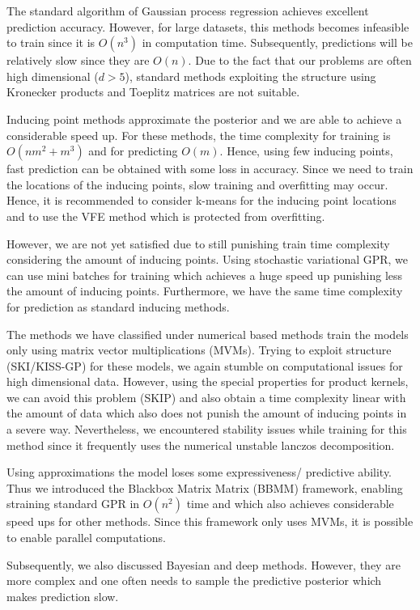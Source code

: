 \documentclass[12pt,a4paper,oneside]{book}
\begin{document}
The standard algorithm of Gaussian process regression achieves excellent prediction accuracy. However, for large datasets, this methods becomes infeasible to train since it is $O(n^3)$ in computation time. Subsequently, predictions will be relatively slow since they are $O(n)$. Due to the fact that our problems are often high dimensional ($d >5$), standard methods exploiting the structure using Kronecker products and Toeplitz matrices are not suitable. 

Inducing point methods approximate the posterior and we are able to achieve a considerable speed up. For these methods, the time complexity for training is $O(nm^2 + m^3)$ and for predicting $O(m)$. Hence, using few inducing points, fast prediction can be obtained with some loss in accuracy. Since we need to train the locations of the inducing points, slow training and overfitting may occur. Hence, it is recommended to consider k-means for the inducing point locations and to use the VFE method which is protected from overfitting.  

However, we are not yet satisfied due to still punishing train time complexity considering the amount of inducing points. Using stochastic variational GPR, we can use mini batches for training which achieves a huge speed up punishing less the amount of inducing points. Furthermore, we have the same time complexity for prediction as standard inducing methods. 

The methods we have classified under numerical based methods train the models only using matrix vector multiplications (MVMs). Trying to exploit structure (SKI/KISS-GP) for these models, we again stumble on computational issues for high dimensional data. However, using the special properties for product kernels, we can avoid this problem (SKIP) and also obtain a time complexity linear with the amount of data which also does not punish the amount of inducing points in a severe way. Nevertheless,  we encountered stability issues while training for this method since it frequently uses the numerical unstable lanczos decomposition. 

Using approximations the model loses some expressiveness/ predictive ability. Thus we introduced the Blackbox Matrix Matrix (BBMM) framework, enabling straining standard GPR in $O(n^2)$ time and which also achieves considerable speed ups for other methods. Since this framework only uses MVMs, it is possible to enable parallel computations. 


Subsequently, we also discussed Bayesian and deep methods. However, they are more complex and one often needs to sample the predictive posterior which makes prediction slow. 
\end{document}
